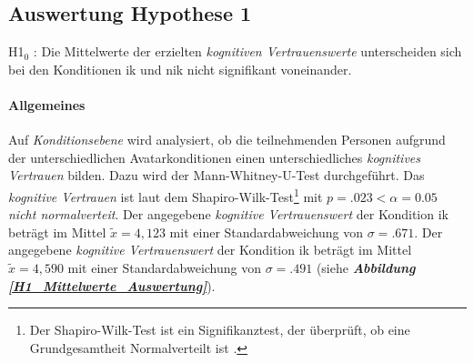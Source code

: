 \documentclass[a4paper,11pt]{article}%
\renewcommand{\\}{\vspace*{0.5\baselineskip} \newline}
\begin{document}
%
%

\clearpage
\newpage	
	\subsection{Auswertung Hypothese 1}
H1$_{0}$ : Die Mittelwerte der erzielten \textit{kognitiven Vertrauenswerte} unterscheiden sich bei den Konditionen \ac{ik} und \ac{nik} nicht signifikant voneinander.

\paragraph{Allgemeines}
Auf \textit{Konditionsebene} wird analysiert, ob die teilnehmenden Personen aufgrund der unterschiedlichen Avatarkonditionen einen unterschiedliches \textit{kognitives Vertrauen} bilden. Dazu wird der Mann-Whitney-U-Test durchgeführt.\\
Das \textit{kognitive Vertrauen} ist laut dem Shapiro-Wilk-Test\footnote{Der Shapiro-Wilk-Test ist ein Signifikanztest, der überprüft, ob eine Grundgesamtheit Normalverteilt ist \citep[S.25]{razali2011power}.} mit $p = .023 < \alpha = 0.05$ \textit{nicht normalverteit}.
Der angegebene \textit{kognitive Vertrauenswert} der Kondition \ac{ik} beträgt im Mittel $\tilde x = 4,123$ mit einer Standardabweichung von $\sigma = .671$.\newline 
Der angegebene \textit{kognitive Vertrauenswert} der Kondition \ac{ik} beträgt im Mittel $\tilde x = 4,590$ mit einer Standardabweichung von $\sigma = .491$ (siehe \textbf{\textit{Abbildung \ref{H1_Mittelwerte_Auswertung}}}).
\end{document}
